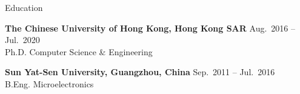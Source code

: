 

\begin{rSection}{Education}

{\bf The Chinese University of Hong Kong, Hong Kong SAR} \hfill { Aug.~2016 -- Jul.~2020}\\
Ph.D. \quad Computer Science \& Engineering

{\bf Sun Yat-Sen University, Guangzhou, China} \hfill { Sep.~2011 -- Jul.~2016}\\
B.Eng. \quad Microelectronics
\end{rSection}

